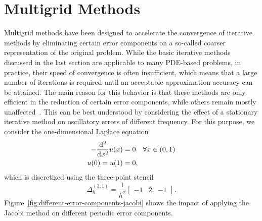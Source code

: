 \section{Multigrid Methods}
Multigrid methods have been designed to accelerate the convergence of iterative methods by eliminating certain error components on a so-called coarser representation of the original problem.
While the basic iterative methods discussed in the last section are applicable to many PDE-based problems, in practice, their speed of convergence is often insufficient, which means that a large number of iterations is required until an acceptable approximation accuracy can be attained. 
The main reason for this behavior is that these methods are only efficient in the reduction of certain error components, while others remain mostly unaffected~\cite{briggs2000multigrid}.
This can be best understood by considering the effect of a stationary iterative method on oscillatory errors of different frequency.
For this purpose, we consider the one-dimensional Laplace equation
\begin{equation}
		\begin{split}
			- \dv[2]{x} u(x) & = 0 \quad \forall x \in (0, 1) \\
			u(0) = u(1) & = 0,
		\end{split}
		\label{eq:1D-laplace-model}
\end{equation}
which is discretized using the three-point stencil
\begin{equation}
	\Delta_h^{(3, 1)} = \frac{1}{h^2}\begin{bmatrix}
		-1 & 2 & -1
	\end{bmatrix}.
\end{equation} 
Figure~\ref{fig:different-error-components-jacobi} shows the impact of applying the Jacobi method on different periodic error components.
